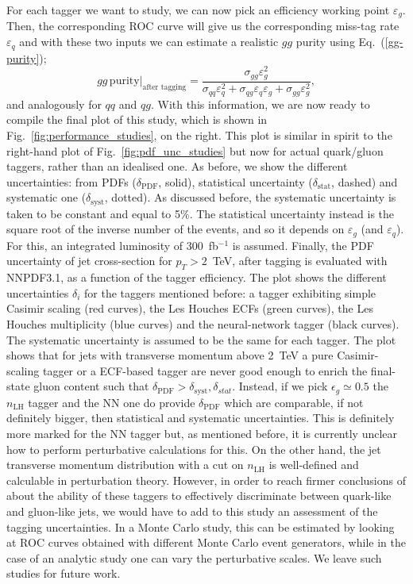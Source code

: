 For each tagger we want to study, we can now pick an efficiency working point $\varepsilon_g$. Then, the corresponding ROC curve will give us the corresponding miss-tag rate $\varepsilon_q$ and with these two inputs we can estimate a realistic $gg$ purity using Eq.~(\ref{gg-purity});
\begin{equation}\label{gg-purity-after-tagging}
gg \, \text{purity}\Big|_\text{after tagging}= \frac{\sigma_{gg} \varepsilon_g^2}{\sigma_{qq}\varepsilon_q^2+\sigma_{qg}\varepsilon_q \varepsilon_g +\sigma_{gg} \varepsilon_g^2},
\end{equation}
and analogously for $qq$ and $qg$. With this information, we are now ready to compile the final plot of this study, which is shown in Fig.~\ref{fig:performance_studies}, on the right. 
This plot is similar in spirit to the right-hand plot of Fig.~\ref{fig:pdf_unc_studies} but now for actual quark/gluon taggers, rather than an idealised one.
%
As before, we show the different uncertainties: from PDFs ($\delta_\text{PDF}$, solid), statistical uncertainty ($\delta_\text{stat}$, dashed) and systematic one ($\delta_\text{syst}$, dotted). As discussed before, the systematic uncertainty is taken to be constant and equal to 5\%. The statistical uncertainty instead is the square root of the inverse number of the events, and so it  depends on $\varepsilon_g$ (and $\varepsilon_q$). For this, an integrated luminosity of 300~fb$^{-1}$ is assumed. Finally,  the PDF uncertainty of jet cross-section for $p_T>2$~TeV, after tagging is evaluated with NNPDF3.1, as a function of the tagger efficiency. 
%
The plot shows the different uncertainties $\delta_i$ for the taggers mentioned before: a tagger exhibiting simple Casimir scaling (red curves), the Les Houches ECFs (green curves), the Les Houches multiplicity (blue curves) and the neural-network tagger (black curves). The systematic uncertainty is assumed to be the same for each tagger. 
%
The plot shows that for jets with transverse momentum above 2~TeV a pure Casimir-scaling tagger or a ECF-based tagger are never good enough to enrich the final-state gluon content such that $\delta_\text{PDF}> \delta_\text{syst}, \delta_{stat}$.
%
Instead, if we pick $\epsilon_g\simeq 0.5$ the $n_\text{LH}$ tagger and the NN one do provide $\delta_\text{PDF}$ which are comparable, if not definitely bigger, then statistical and systematic uncertainties. This is definitely more marked for the NN tagger but, as mentioned before, it is currently unclear how to perform perturbative calculations for this. On the other hand, the jet transverse momentum distribution with a cut on $n_\text{LH}$ is well-defined and calculable in perturbation theory. 
%
However, in order to reach firmer conclusions of about the ability of these taggers to effectively discriminate between quark-like and gluon-like jets, we would have to add to this study an assessment of the tagging uncertainties. In a Monte Carlo study, this can be estimated by looking at ROC curves obtained with different Monte Carlo event generators, while in the case of an analytic study one can vary the perturbative scales. We leave such studies for future work. 
